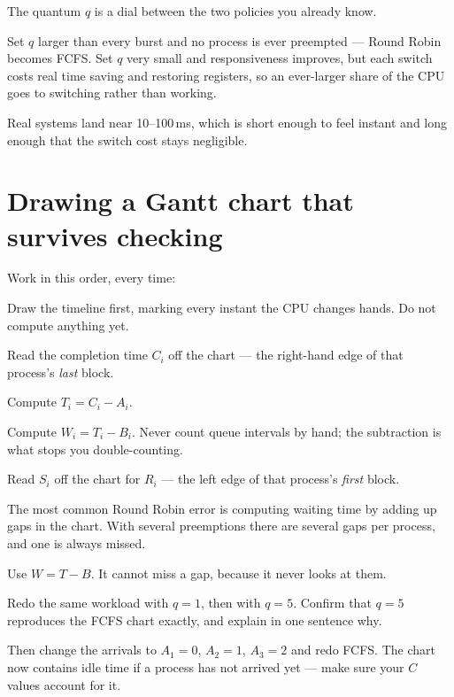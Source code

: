 \begin{intuition}
The quantum $q$ is a dial between the two policies you already know.

Set $q$ larger than every burst and no process is ever preempted --- Round Robin becomes FCFS. Set $q$ very small and responsiveness improves, but each switch costs real time saving and restoring registers, so an ever-larger share of the CPU goes to switching rather than working.

Real systems land near 10--100\,ms, which is short enough to feel instant and long enough that the switch cost stays negligible.
\end{intuition}

\section{Drawing a Gantt chart that survives checking}
Work in this order, every time:

\begin{mlsteps}
  \item Draw the timeline first, marking every instant the CPU changes hands. Do not compute anything yet.
  \item Read the completion time $C_i$ off the chart --- the right-hand edge of that process's \emph{last} block.
  \item Compute $T_i = C_i - A_i$.
  \item Compute $W_i = T_i - B_i$. Never count queue intervals by hand; the subtraction is what stops you double-counting.
  \item Read $S_i$ off the chart for $R_i$ --- the left edge of that process's \emph{first} block.
\end{mlsteps}

\begin{pitfall}
The most common Round Robin error is computing waiting time by adding up gaps in the chart. With several preemptions there are several gaps per process, and one is always missed.

Use $W = T - B$. It cannot miss a gap, because it never looks at them.
\end{pitfall}

\begin{tryit}
Redo the same workload with $q = 1$, then with $q = 5$. Confirm that $q = 5$ reproduces the FCFS chart exactly, and explain in one sentence why.

Then change the arrivals to $A_1 = 0$, $A_2 = 1$, $A_3 = 2$ and redo FCFS. The chart now contains idle time if a process has not arrived yet --- make sure your $C$ values account for it.
\end{tryit}

